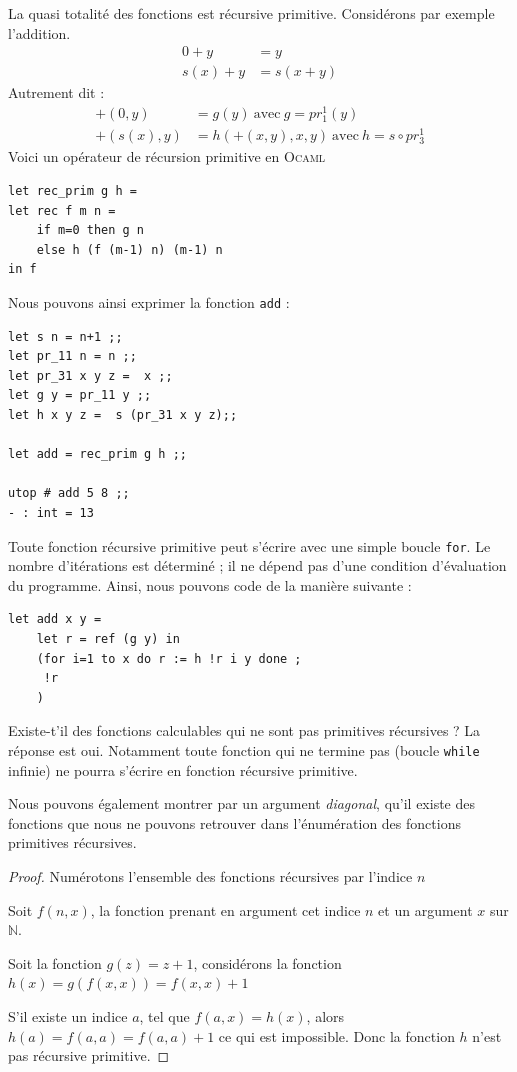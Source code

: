 La quasi totalité des fonctions est récursive primitive. Considérons par exemple l'addition.
\begin{align*}
	0 + y &= y  \\
	s(x) + y &= s(x+y) 
\end{align*}
Autrement dit :
\begin{align*}
	+ (0, y) &=  g(y)\ \text{avec}\ g=pr_1^1 (y) \\
	+ (s(x), y) &= h (+(x, y), x, y)\ \text{avec}\ h=s \circ  pr_3^1
\end{align*}
Voici un opérateur de récursion primitive en \textsc{Ocaml}
\begin{Verbatim}
let rec_prim g h = 
let rec f m n = 
	if m=0 then g n 
	else h (f (m-1) n) (m-1) n
in f 
\end{Verbatim}
Nous pouvons ainsi exprimer la fonction \verb+add+ :
\begin{Verbatim}
let s n = n+1 ;;
let pr_11 n = n ;;
let pr_31 x y z =  x ;;
let g y = pr_11 y ;;
let h x y z =  s (pr_31 x y z);;

let add = rec_prim g h ;;

utop # add 5 8 ;;
- : int = 13
\end{Verbatim}
Toute fonction récursive primitive peut s'écrire avec une simple boucle \verb+for+.
Le nombre d'itérations est déterminé ; il ne dépend pas d'une condition d'évaluation du programme.
Ainsi, nous pouvons code de la manière suivante :
\begin{Verbatim}
let add x y =
	let r = ref (g y) in
	(for i=1 to x do r := h !r i y done ; 
	 !r
	)
\end{Verbatim}
Existe-t'il des fonctions calculables qui ne sont pas primitives récursives ?
La réponse est oui. Notamment toute fonction qui ne termine pas (boucle \verb+while+ infinie)
ne pourra s'écrire en fonction récursive primitive.


Nous pouvons également montrer par un  argument \textit{diagonal}, qu'il existe des fonctions que nous ne 
pouvons retrouver dans l'énumération des fonctions primitives récursives.
\begin{proof}
	Numérotons l'ensemble des fonctions récursives par l'indice $n$

	Soit $f(n,x)$, la fonction prenant en argument cet indice $n$ et un argument $x$ sur $\mathbb{N}$.
       
	Soit la fonction $g(z)=z+1$, considérons la fonction $h(x)=g(f(x,x))=f(x,x)+1$

        S'il existe un indice $a$, tel que $f(a,x)=h(x)$, alors $h(a)=f(a,a)=f(a,a)+1$ ce qui est 
	impossible. Donc la fonction $h$ n'est pas récursive primitive.

\end{proof}

